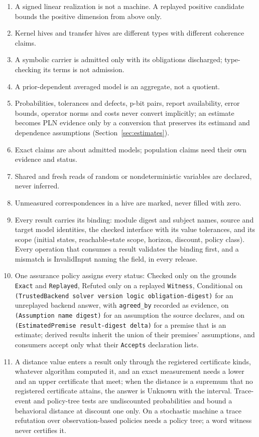\documentclass[11pt]{article}
\newcommand{\code}[1]{\texttt{#1}}
\begin{document}
\begin{enumerate}
\item A signed linear realization is not a machine. A replayed positive candidate bounds the positive
dimension from above only.
\item Kernel hives and transfer hives are different types with different coherence claims.
\item A symbolic carrier is admitted only with its obligations discharged; type-checking its terms is
not admission.
\item A prior-dependent averaged model is an aggregate, not a quotient.
\item Probabilities, tolerances and defects, p-bit pairs, report availability, error bounds, operator
norms and costs never convert implicitly; an estimate becomes PLN evidence only by a conversion that
preserves its estimand and dependence assumptions (Section~\ref{sec:estimates}).
\item Exact claims are about admitted models; population claims need their own evidence and status.
\item Shared and fresh reads of random or nondeterministic variables are declared, never inferred.
\item Unmeasured correspondences in a hive are marked, never filled with zero.
\item Every result carries its binding: module digest and subject names, source and target model
identities, the checked interface with its value tolerances, and its scope (initial states,
reachable-state scope, horizon, discount, policy class). Every operation that consumes a result
validates the binding first, and a mismatch is InvalidInput naming the field, in every release.
\item One assurance policy assigns every status: Checked only on the grounds \code{Exact} and
\code{Replayed}, Refuted only on a replayed \code{Witness}, Conditional on
\code{(TrustedBackend solver version logic obligation-digest)} for an unreplayed backend answer, with
\code{agreed\_by} recorded as evidence, on \code{(Assumption name digest)} for an assumption the
source declares, and on \code{(EstimatedPremise result-digest delta)} for a premise that is an
estimate; derived results inherit the union of their premises' assumptions, and consumers accept
only what their \code{Accepts} declaration lists.
\item A distance value enters a result only through the registered certificate kinds, whatever
algorithm computed it, and an exact measurement needs a lower and an upper certificate that meet;
when the distance is a supremum that no registered certificate attains, the answer is Unknown with
the interval. Trace-event and policy-tree tests are undiscounted probabilities and bound a behavioral
distance at discount one only. On a stochastic machine a trace refutation over observation-based
policies needs a policy tree; a word witness never certifies it.
\end{enumerate}
\end{document}
